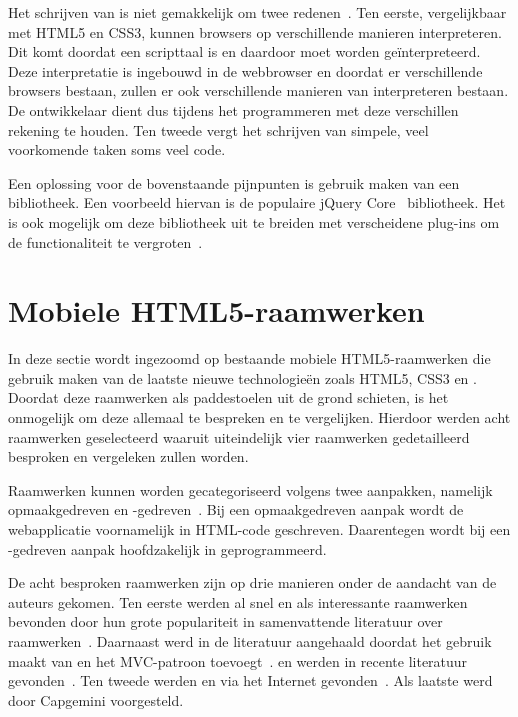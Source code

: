 Het schrijven van \js{} is niet gemakkelijk om twee redenen~\cite{McFarland2011}. 
Ten eerste, vergelijkbaar met HTML5 en CSS3, kunnen browsers \js{} op verschillende manieren interpreteren. 
Dit komt doordat \js{} een scripttaal is en daardoor moet worden geïnterpreteerd.
Deze interpretatie is ingebouwd in de webbrowser en doordat er verschillende browsers bestaan, zullen er ook verschillende manieren van interpreteren bestaan.
De ontwikkelaar dient dus tijdens het programmeren met deze verschillen rekening te houden. 
Ten tweede vergt het schrijven van simpele, veel voorkomende taken soms veel code.

Een oplossing voor de bovenstaande pijnpunten is gebruik maken van een bibliotheek. 
Een voorbeeld hiervan is de populaire jQuery Core~\cite{JQuery2013a} bibliotheek. 
Het is ook mogelijk om deze bibliotheek uit te breiden met verscheidene plug-ins om de functionaliteit te vergroten~\cite{McFarland2011}.


\section{Mobiele HTML5-raamwerken}
\label{sec:mobiele-html5-raamwerken}

In deze sectie wordt ingezoomd op bestaande mobiele HTML5-raamwerken die gebruik maken van de laatste nieuwe technologieën zoals HTML5, CSS3 en \js{}.
Doordat deze raamwerken als paddestoelen uit de grond schieten, is het onmogelijk om deze allemaal te bespreken en te vergelijken.
Hierdoor werden acht raamwerken geselecteerd waaruit uiteindelijk vier raamwerken gedetailleerd besproken en vergeleken zullen worden.

Raamwerken kunnen worden gecategoriseerd volgens twee aanpakken, namelijk opmaakgedreven en \js{}-gedreven~\cite{Oeflman2011}.
Bij een opmaakgedreven aanpak wordt de webapplicatie voornamelijk in HTML-code geschreven. 
Daarentegen wordt bij een \js{}-gedreven aanpak hoofdzakelijk in \js{} geprogrammeerd.

De acht besproken raamwerken zijn op drie manieren onder de aandacht van de auteurs gekomen.
Ten eerste werden al snel \jqm{} en \st{} als interessante raamwerken bevonden door hun grote populariteit in samenvattende literatuur over raamwerken~\cite{Firtman2013,Hales2012,Oeflman2011,David2011}.
Daarnaast werd \tmp{} in de literatuur aangehaald doordat het gebruik maakt van \jqm{} en het MVC-patroon toevoegt~\cite{Firtman2013}.
\lungo{} en \jqt{} werden in recente literatuur gevonden~\cite{Firtman2013,Hales2012}.
Ten tweede werden \kendo{} en \moobile{} via het Internet gevonden~\cite{Bristowe2012}.
Als laatste werd \davinci{} door Capgemini voorgesteld.

